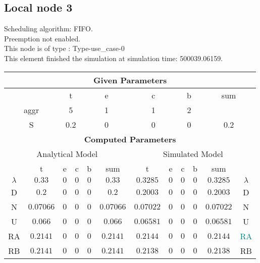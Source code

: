 \documentclass{article}
\begin{document}
\subsection{Local node 3}
Scheduling algorithm: FIFO.\\Preemption not enabled. \\This node is of type : Type-use\_case-0\\
This element finished the simulation at simulation time: 500039.06159.\\
\begin{table}[H]\centering\begin{tabular}{@{}c|cccc|c||cccc|c|c@{}}\toprule\multicolumn{12}{c}{\textbf{Given Parameters}}\\\midrule\multicolumn{2}{c|}{ } & \multicolumn{2}{c}{t} & \multicolumn{2}{c}{e} & \multicolumn{2}{c}{c} & \multicolumn{2}{c}{b} & \multicolumn{2}{|c}{sum} \\\midrule\multicolumn{2}{c|}{aggr} & \multicolumn{2}{c}{5} & \multicolumn{2}{c}{1} & \multicolumn{2}{c}{1} & \multicolumn{2}{c}{2} & \multicolumn{2}{|c}{ } \\ \midrule\multicolumn{2}{c|}{S} & \multicolumn{2}{c}{0.2} & \multicolumn{2}{c}{0} & \multicolumn{2}{c}{0} & \multicolumn{2}{c}{0} & \multicolumn{2}{|c}{0.2}\\ \midrule\midrule\multicolumn{12}{c}{\textbf{Computed Parameters}}\\ \midrule\multicolumn{6}{c||}{Analytical Model} & \multicolumn{6}{c}{Simulated Model}\\ 
 \midrule & t & e & c & b & sum & t & e & c & b & sum &  \\ \midrule$\lambda$ &$0.33$ & $0$ & $0$ & $0$ & $0.33$ & $0.3285$ & $0$ & $0$ & $0$ & $0.3285$& $\lambda$ \\D & $0.2$ & $0$ & $0$ & $0$ & $0.2$ & $0.2003$ & $0$ & $0$ & $0$ & $0.2003$& D\\N & $0.07066$ & $0$ & $0$ & $0$ & $0.07066$ & $0.07022$ & $0$ & $0$ & $0$ & $0.07022$& N\\U & $0.066$ & $0$ & $0$ & $0$ & $0.066$ & $0.06581$ & $0$ & $0$ & $0$ & $0.06581$& U\\RA & $0.2141$ & $0$ & $0$ & $0$ & $0.2141$ & $0.2144$ & $0$ & $0$ & $0$ & $0.2144$& \textcolor{teal}{RA}\\RB & $0.2141$ & $0$ & $0$ & $0$ & $0.2141$ & $0.2138$ & $0$ & $0$ & $0$ & $0.2138$& RB\\
\bottomrule
\end{tabular}
\end{table}
\filbreak
\end{document}
